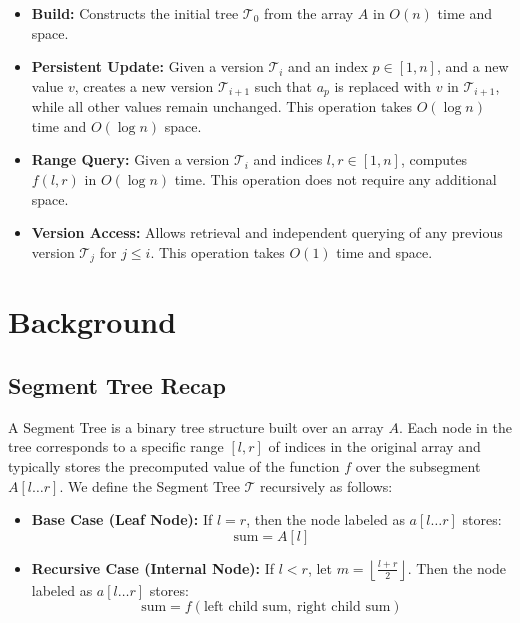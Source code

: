 \documentclass{fairmeta}
\numberwithin{equation}{section}
\begin{document}
\begin{itemize}
    \item \textbf{Build:} Constructs the initial tree $\mathcal{T}_0$ from the array $A$ in $O(n)$ time and space.
    \item \textbf{Persistent Update:} Given a version $\mathcal{T}_i$ and an index $p \in [1, n]$, and a new value $v$, creates a new version $\mathcal{T}_{i+1}$ such that $a_p$ is replaced with $v$ in $\mathcal{T}_{i+1}$, while all other values remain unchanged. This operation takes $O(\log n)$ time and $O(\log n)$ space.
    \item \textbf{Range Query:} Given a version $\mathcal{T}_i$ and indices $l, r \in [1, n]$, computes $f(l, r)$ in $O(\log n)$ time. This operation does not require any additional space.
    \item \textbf{Version Access:} Allows retrieval and independent querying of any previous version $\mathcal{T}_j $ for $j \le i$. This operation takes $O(1)$ time and space.
\end{itemize}

\section{Background}\label{section:background}

\subsection*{Segment Tree Recap}

A Segment Tree is a binary tree structure built over an array $A$. Each node in the tree corresponds to a specific range $[l, r]$ of indices in the original array and typically stores the precomputed value of the function $f$ over the subsegment $A[l \ldots r]$. We define the Segment Tree $\mathcal{T}$ recursively as follows:

\begin{itemize}
    \item \textbf{Base Case (Leaf Node):}
          If $l = r$, then the node labeled as $a[l \dots r]$ stores:
          \[
              \text{sum} = A[l]
          \]

    \item \textbf{Recursive Case (Internal Node):}
          If $l < r$, let $m = \left\lfloor \frac{l + r}{2} \right\rfloor$. Then the node labeled as $a[l \dots r]$ stores:
          \[
              \text{sum} = f\left(\text{left child sum},\ \text{right child sum}\right)
          \]
\end{itemize}
\end{document}
